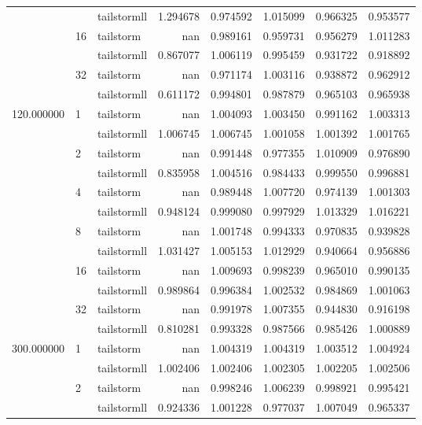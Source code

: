 \begin{tabular}{lllrrrrr}
 &  & tailstormll & 1.294678 & 0.974592 & 1.015099 & 0.966325 & 0.953577 \\
 & \multirow[c]{2}{*}{16} & tailstorm & nan & 0.989161 & 0.959731 & 0.956279 & 1.011283 \\
 &  & tailstormll & 0.867077 & 1.006119 & 0.995459 & 0.931722 & 0.918892 \\
 & \multirow[c]{2}{*}{32} & tailstorm & nan & 0.971174 & 1.003116 & 0.938872 & 0.962912 \\
 &  & tailstormll & 0.611172 & 0.994801 & 0.987879 & 0.965103 & 0.965938 \\
\multirow[c]{12}{*}{120.000000} & \multirow[c]{2}{*}{1} & tailstorm & nan & 1.004093 & 1.003450 & 0.991162 & 1.003313 \\
 &  & tailstormll & 1.006745 & 1.006745 & 1.001058 & 1.001392 & 1.001765 \\
 & \multirow[c]{2}{*}{2} & tailstorm & nan & 0.991448 & 0.977355 & 1.010909 & 0.976890 \\
 &  & tailstormll & 0.835958 & 1.004516 & 0.984433 & 0.999550 & 0.996881 \\
 & \multirow[c]{2}{*}{4} & tailstorm & nan & 0.989448 & 1.007720 & 0.974139 & 1.001303 \\
 &  & tailstormll & 0.948124 & 0.999080 & 0.997929 & 1.013329 & 1.016221 \\
 & \multirow[c]{2}{*}{8} & tailstorm & nan & 1.001748 & 0.994333 & 0.970835 & 0.939828 \\
 &  & tailstormll & 1.031427 & 1.005153 & 1.012929 & 0.940664 & 0.956886 \\
 & \multirow[c]{2}{*}{16} & tailstorm & nan & 1.009693 & 0.998239 & 0.965010 & 0.990135 \\
 &  & tailstormll & 0.989864 & 0.996384 & 1.002532 & 0.984869 & 1.001063 \\
 & \multirow[c]{2}{*}{32} & tailstorm & nan & 0.991978 & 1.007355 & 0.944830 & 0.916198 \\
 &  & tailstormll & 0.810281 & 0.993328 & 0.987566 & 0.985426 & 1.000889 \\
\multirow[c]{12}{*}{300.000000} & \multirow[c]{2}{*}{1} & tailstorm & nan & 1.004319 & 1.004319 & 1.003512 & 1.004924 \\
 &  & tailstormll & 1.002406 & 1.002406 & 1.002305 & 1.002205 & 1.002506 \\
 & \multirow[c]{2}{*}{2} & tailstorm & nan & 0.998246 & 1.006239 & 0.998921 & 0.995421 \\
 &  & tailstormll & 0.924336 & 1.001228 & 0.977037 & 1.007049 & 0.965337 \\

\end{tabular}
